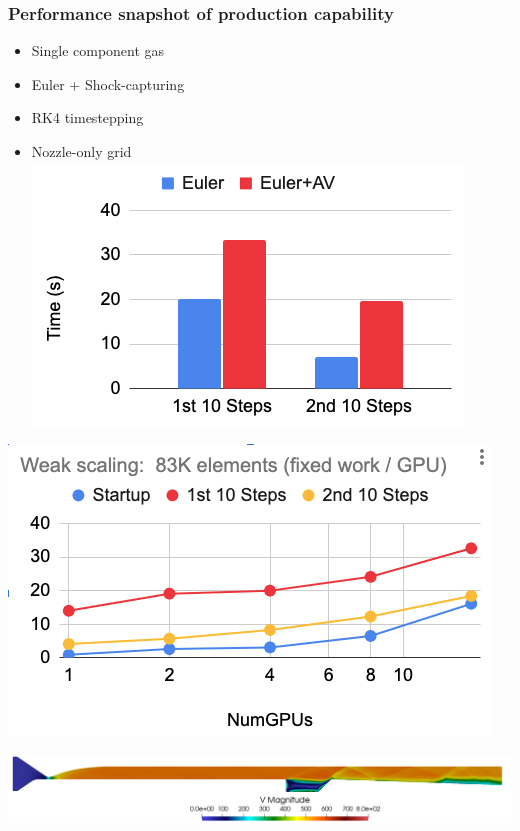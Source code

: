 \begin{frame}\frametitle{Performance snapshot of production capability}
\begin{multicols}{2}
\begin{itemize}
\item Single component gas
\item Euler + Shock-capturing
\item RK4 timestepping
\item Nozzle-only grid
\includegraphics[width=.5\textwidth]{figures/AVCost.png}
\end{itemize}
\columnbreak
\includegraphics[width=.5\textwidth]{figures/weak_scaling_gpu.png}
\end{multicols}
\begin{center}
\includegraphics[width=\textwidth]{figures/shock_cap.png}\\
\end{center}
\end{frame}

